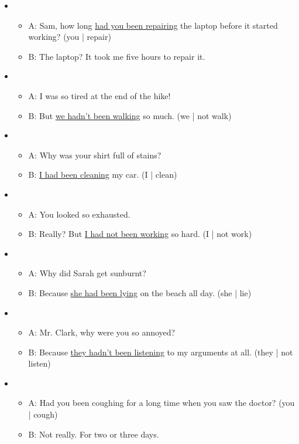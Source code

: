 \begin{itemize}

\item
\begin{itemize}
\item A: Sam, how long \underline{had you been repairing} the laptop before it started working? (you | repair)
\item B: The laptop? It took me five hours to repair it.
\end{itemize}

\item
\begin{itemize}
\item A: I was so tired at the end of the hike!
\item B: But \underline{we hadn't been walking} so much. (we | not walk)
\end{itemize}

\item
\begin{itemize}
\item A: Why was your shirt full of stains?
\item B: \underline{I had been cleaning} my car. (I | clean)
\end{itemize}

\item
\begin{itemize}
\item A: You looked so exhausted.
\item B: Really? But \underline{I had not been working} so hard. (I | not work)
\end{itemize}

\item
\begin{itemize}
\item A: Why did Sarah get sunburnt?
\item B: Because \underline{she had been lying} on the beach all day. (she | lie)
\end{itemize}

\item
\begin{itemize}
\item A: Mr. Clark, why were you so annoyed?
\item B: Because \underline{they hadn't been listening} to my arguments at all. (they | not listen)
\end{itemize}

\item
\begin{itemize}
\item A: {Had you been coughing} for a long time when you saw the doctor? (you | cough)
\item B: Not really. For two or three days.
\end{itemize}


\end{itemize}
